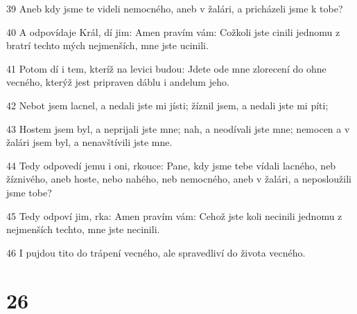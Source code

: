 \par 39 Aneb kdy jsme te videli nemocného, aneb v žalári, a pricházeli jsme k tobe?
\par 40 A odpovídaje Král, dí jim: Amen pravím vám: Cožkoli jste cinili jednomu z bratrí techto mých nejmenších, mne jste ucinili.
\par 41 Potom dí i tem, kteríž na levici budou: Jdete ode mne zlorecení do ohne vecného, kterýž jest pripraven dáblu i andelum jeho.
\par 42 Nebot jsem lacnel, a nedali jste mi jísti; žíznil jsem, a nedali jste mi píti;
\par 43 Hostem jsem byl, a neprijali jste mne; nah, a neodívali jste mne; nemocen a v žalári jsem byl, a nenavštívili jste mne.
\par 44 Tedy odpovedí jemu i oni, rkouce: Pane, kdy jsme tebe vídali lacného, neb žíznivého, aneb hoste, nebo nahého, neb nemocného, aneb v žalári, a neposloužili jsme tobe?
\par 45 Tedy odpoví jim, rka: Amen pravím vám: Cehož jste koli necinili jednomu z nejmenších techto, mne jste necinili.
\par 46 I pujdou tito do trápení vecného, ale spravedliví do života vecného.

\chapter{26}

